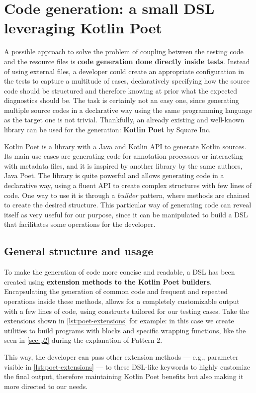 \documentclass[12pt,a4paper,openright,twoside]{book}
\begin{document}
\section{Code generation: a small DSL leveraging Kotlin Poet}

A possible approach to solve the problem of coupling between the testing code
and the resource files is \textbf{code generation done directly inside tests}.
Instead of using external files, a developer could create an appropriate
configuration in the tests to capture a multitude of cases, declaratively 
specifying how the source code should be structured and therefore knowing at
prior what the expected diagnostics should be.
%
The task is certainly not an easy one, since generating multiple source codes in
a declarative way using the same programming language as the target one is not
trivial. Thankfully, an already existing and well-known library can be used for
the generation: \textbf{Kotlin Poet} by Square Inc.

Kotlin Poet is a library with a Java and Kotlin API to generate Kotlin sources.
Its main use cases are generating code for annotation processors or interacting
with metadata files, and it is inspired by another library by the same authors,
Java Poet. 
%
The library is quite powerful and allows generating code in a declarative way,
using a fluent API to create complex structures with few lines of code. One
way to use it is through a \emph{builder} pattern, where methods are chained to
create the desired structure. This particular way of generating code can reveal
itself as very useful for our purpose, since it can be manipulated to build a 
\ac{DSL} that facilitates some operations for the developer.

\subsection{General structure and usage}

To make the generation of code more concise and readable, a \ac{DSL} has been
created using \textbf{extension methods to the Kotlin Poet builders}.
Encapsulating the generation of common code and frequent and repeated operations
inside these methods, allows for a completely customizable output with a few
lines of code, using constructs tailored for our testing cases. 
%
Take the extensions shown in \cref{lst:poet-extensions} for example: in this
case we create utilities to build programs with blocks and specific wrapping
functions, like the  seen in \cref{sec:p2} during the
explanation of Pattern 2. 
%

%
This way, the developer can pass other extension methods --- e.g., parameter
 visible in \cref{lst:poet-extensions} --- to these
\ac{DSL}-like keywords to highly customize the final output, therefore 
maintaining Kotlin Poet benefits but also making it more directed to 
our needs. 
\end{document}
